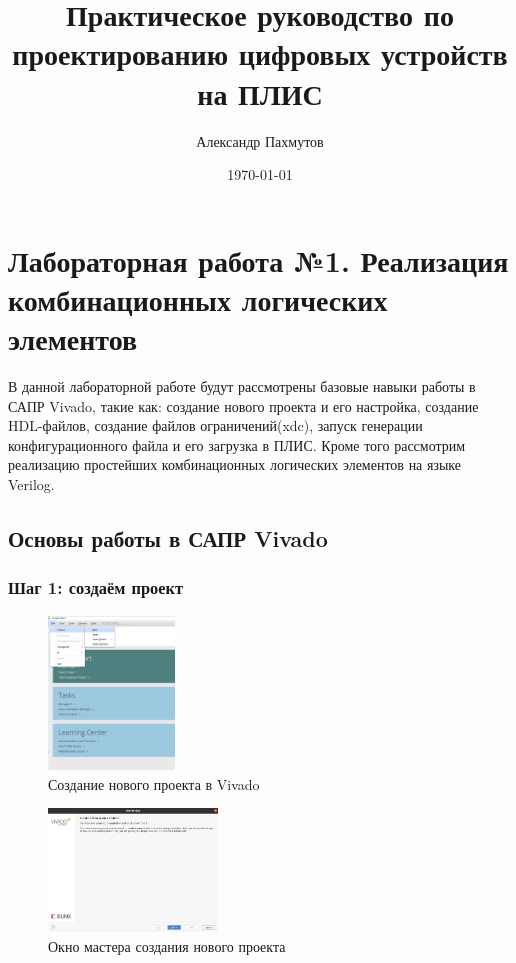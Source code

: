 \documentclass[a4paper,oneside ,14pt]{extreport}
\author{Александр Пахмутов}
\title{Практическое руководство по проектированию цифровых устройств на ПЛИС}
\date{\today}
\begin{document}
\maketitle
\thispagestyle{empty} 
\newpage 

\tableofcontents{}

\newpage

\chapter{Лабораторная работа №1. Реализация комбинационных логических элементов}

В данной лабораторной работе будут рассмотрены базовые навыки работы в САПР Vivado, такие как: создание нового проекта и 
его настройка, создание HDL-файлов, создание файлов ограничений(xdc), запуск генерации конфигурационного файла и его загрузка в ПЛИС.
Кроме того рассмотрим реализацию простейших комбинационных логических элементов на языке Verilog.

\section{Основы работы в САПР Vivado}

\subsection{Шаг 1: создаём проект}

\begin{figure}[!ht]
	\centering
	\includegraphics[width=0.3\textwidth]{image/m_3.png}
	\caption{Создание нового проекта в Vivado}
	\label{l1_new_prj}
\end{figure}

\begin{figure}[!ht]
	\centering
	\includegraphics[width=0.4\textwidth]{image/2}
	\caption{Окно мастера создания нового проекта}
	\label{l1_master}
\end{figure}
\end{document}
